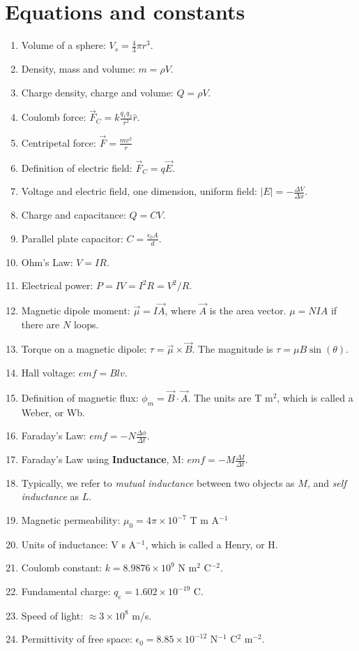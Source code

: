 \documentclass[10pt]{article}
\begin{document}
\maketitle

\section{Equations and constants}

\begin{enumerate}
\item Volume of a sphere: $V_s = \frac{4}{3}\pi r^3$.
\item Density, mass and volume: $m = \rho V$.
\item Charge density, charge and volume: $Q = \rho V$.
\item Coulomb force: $\vec{F}_C = k \frac{q_1 q_2}{r^2}\hat{r}$.
\item Centripetal force: $\vec{F} = \frac{mv^2}{r}$
\item Definition of electric field: $\vec{F}_C = q\vec{E}$.
\item Voltage and electric field, one dimension, uniform field: $|E| = - \frac{\Delta V}{\Delta x}$.
\item Charge and capacitance: $Q = CV$.
\item Parallel plate capacitor: $C = \frac{\epsilon_0 A}{d}$.
\item Ohm's Law: $V = IR$.
\item Electrical power: $P = IV = I^2 R = V^2/R$.
\item Magnetic dipole moment: $\vec{\mu} = I \vec{A}$, where $\vec{A}$ is the area vector. $\mu = N I A$ if there are $N$ loops.
\item Torque on a magnetic dipole: $\tau = \vec{\mu} \times \vec{B}$.  The magnitude is $\tau = \mu B \sin(\theta)$.
\item Hall voltage: $emf = B l v$.
\item Definition of magnetic flux: $\phi_m = \vec{B} \cdot \vec{A}$.  The units are T m$^2$, which is called a Weber, or Wb.
\item Faraday's Law: $emf = -N \frac{\Delta \phi}{\Delta t}$.
\item Faraday's Law using \textbf{Inductance}, M: $emf = -M \frac{\Delta I}{\Delta t}$.
\item Typically, we refer to \textit{mutual inductance} between two objects as $M$, and \textit{self inductance} as $L$.
\item Magnetic permeability: $\mu_0 = 4\pi \times 10^{-7}$ T m A$^{-1}$
\item Units of inductance: V s A$^{-1}$, which is called a Henry, or H.
\item Coulomb constant: $k = 8.9876 \times 10^{9}$ N m$^2$ C$^{-2}$.
\item Fundamental charge: $q_e = 1.602 \times 10^{-19}$ C.
\item Speed of light: $\approx 3 \times 10^{8}$ m/s.
\item Permittivity of free space: $\epsilon_0 = 8.85 \times 10^{-12}$ N$^{-1}$ C$^2$ m$^{-2}$.
\end{enumerate}
\end{document}

